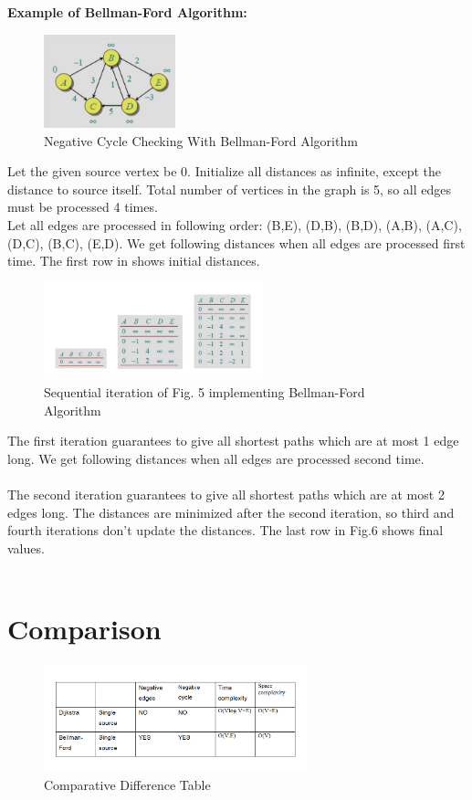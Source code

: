 \documentclass[a4paper,10pt]{article}
\begin{document}
\textbf{Example of Bellman-Ford Algorithm:}\\

\begin{figure}[h]
 \centering
  \includegraphics[width=1.5in]{belfigd.png}
    \caption{Negative Cycle Checking With Bellman-Ford Algorithm~\cite{re7}}
  \label{fig:bel fig d}
\end{figure}
\vspace{.5 cm} Let the given source vertex be 0. Initialize all distances as infinite, except the distance to source itself. Total number of vertices in the graph is 5, so all edges must be processed 4 times.\\

Let all edges are processed in following order: (B,E), (D,B), (B,D), (A,B), (A,C), (D,C), (B,C), (E,D). We get following distances when all edges are processed first time. The first row in shows initial distances.\\
\begin{figure}[h]
 \centering
  \includegraphics[width=2.5in]{belfige.png}
    \caption{Sequential iteration of Fig. 5 implementing Bellman-Ford Algorithm~\cite{re7}}
  \label{fig:bel fig e}
\end{figure}
The first iteration guarantees to give all shortest paths which are at most 1 edge long. We get following distances when all edges are processed second time.\\\\
The second iteration guarantees to give all shortest paths which are at most 2 edges long. The distances are minimized after the second iteration, so third and fourth iterations don’t update the distances. The last row in Fig.6 shows final values.
\\\\
\section{Comparison}
\begin{figure}[h]
 \centering
  \includegraphics[width=3.0in]{comfigc.png}
    \caption{Comparative Difference Table~\cite{re8}}
  \label{fig:com fig c}
\end{figure}
\end{document}
